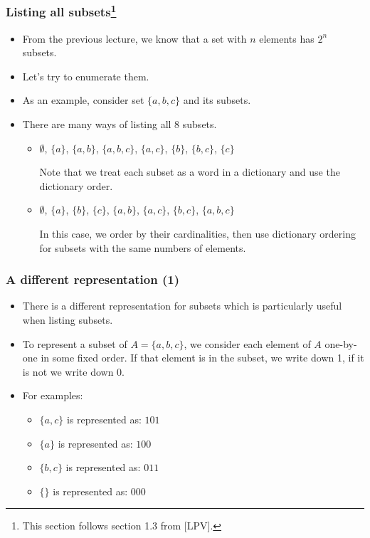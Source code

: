 

\begin{frame}\frametitle{Listing all subsets\footnote{This section follows section 1.3 from [LPV].}}
  \begin{itemize}
  \item From the previous lecture, we know that a set with $n$
    elements has $2^n$ subsets.
  \item Let's try to enumerate them. \pause
  \item As an example, consider set $\{a,b,c\}$ and its subsets.
  \item There are many ways of listing all 8 subsets.
    \pause
    \begin{itemize}
    \item $\emptyset$, $\{a\}$, $\{a,b\}$, $\{a,b,c\}$,
      $\{a,c\}$, $\{b\}$, $\{b,c\}$, $\{c\}$
      \pause

      Note that we treat each subset as a word in a dictionary and use
      the dictionary order.
      \pause
      
    \item $\emptyset$, $\{a\}$, $\{b\}$, $\{c\}$,
      $\{a,b\}$, $\{a,c\}$, $\{b,c\}$, $\{a,b,c\}$
      \pause

      In this case, we order by their cardinalities, then use
      dictionary ordering for subsets with the same numbers of
      elements.
    \end{itemize}
  \end{itemize}
\end{frame}

\begin{frame}\frametitle{A different representation (1)}
  \begin{itemize}
  \item There is a different representation for subsets which is
    particularly useful when listing subsets.
  \item To represent a subset of $A=\{a,b,c\}$, we consider each
    element of $A$ one-by-one in some fixed order.  If that element is
    in the subset, we write down 1, if it is not we write down 0.
  \item For examples:
    \begin{itemize}
    \item $\{a,c\}$ is represented as: \pause $101$
    \item $\{a\}$ is represented as: \pause $100$
    \item $\{b,c\}$ is represented as: \pause $011$
    \item $\{\}$ is represented as: \pause $000$
    \end{itemize}
  \end{itemize}
\end{frame}

